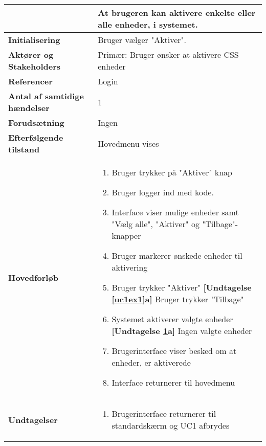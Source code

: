\begin{table}[H]
\begin{tabular}{|p{6cm}|p{8cm}|}
\begin{enumerate}[label= \ref{UC8und2}a.]
		\textbf{Mål}							&At brugeren kan aktivere enkelte eller alle enheder, i systemet.	\\\hline
		\textbf{Initialisering}				&Bruger vælger "Aktiver". 										\\\hline
		\textbf{Aktører og Stakeholders}		&Primær: Bruger ønsker at aktivere CSS enheder					\\\hline
		\textbf{Referencer}					&Login															\\\hline
		\textbf{Antal af samtidige hændelser}&1 																\\\hline
		\textbf{Forudsætning}				&Ingen															\\\hline
		\textbf{Efterfølgende tilstand}		&Hovedmenu vises 												\\\hline
		\textbf{Hovedforløb}					
			&\begin{enumerate}
	
				\item Bruger trykker på "Aktiver" knap
				
				\item Bruger logger ind med kode.
										
				\item Interface viser mulige enheder samt "Vælg alle", "Aktiver" og "Tilbage"-knapper
												
				\item \label{uc1select} Bruger markerer ønskede enheder til aktivering
												
				\item \label{uc1ex1} Bruger trykker "Aktiver"\newline
					\textbf{[Undtagelse \ref{uc1ex1}a]} Bruger trykker "Tilbage"
												
				\item \label{uc1ex2} Systemet aktiverer valgte enheder\newline
					\textbf{[Undtagelse \ref{uc1ex2}a]} Ingen valgte enheder
				
				\item Brugerinterface viser besked om at enheder, er aktiverede
																	
				\item Interface returnerer til hovedmenu
												
			\end{enumerate}\\\hline
		
		\textbf{Undtagelser}					
		&\begin{enumerate}[label= \ref{uc1ex1}a.]
			\item Brugerinterface returnerer til standardskærm og UC1 afbrydes
		\end{enumerate}
											

\end{enumerate}
\end{tabular}
\end{table}
